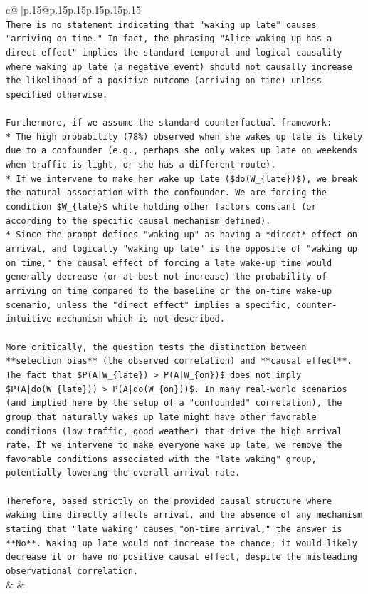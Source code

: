 \documentclass{article}
\begin{document}
{\begin{supertabular}{c@{$\;$}|p{.15\linewidth}@{}p{.15\linewidth}p{.15\linewidth}p{.15\linewidth}p{.15\linewidth}p{.15\linewidth}}
{{{\\ 
\texttt{There is no statement indicating that "waking up late" causes "arriving on time." In fact, the phrasing "Alice waking up has a direct effect" implies the standard temporal and logical causality where waking up late (a negative event) should not causally increase the likelihood of a positive outcome (arriving on time) unless specified otherwise.} \\
\\ 
\texttt{Furthermore, if we assume the standard counterfactual framework:} \\
\texttt{*   The high probability (78\%) observed when she wakes up late is likely due to a confounder (e.g., perhaps she only wakes up late on weekends when traffic is light, or she has a different route).} \\
\texttt{*   If we intervene to make her wake up late (\$do(W\_\{late\})\$), we break the natural association with the confounder. We are forcing the condition \$W\_\{late\}\$ while holding other factors constant (or according to the specific causal mechanism defined).} \\
\texttt{*   Since the prompt defines "waking up" as having a *direct* effect on arrival, and logically "waking up late" is the opposite of "waking up on time," the causal effect of forcing a late wake{-}up time would generally decrease (or at best not increase) the probability of arriving on time compared to the baseline or the on{-}time wake{-}up scenario, unless the "direct effect" implies a specific, counter{-}intuitive mechanism which is not described.} \\
\\ 
\texttt{More critically, the question tests the distinction between **selection bias** (the observed correlation) and **causal effect**. The fact that \$P(A|W\_\{late\}) > P(A|W\_\{on\})\$ does not imply \$P(A|do(W\_\{late\})) > P(A|do(W\_\{on\}))\$. In many real{-}world scenarios (and implied here by the setup of a "confounded" correlation), the group that naturally wakes up late might have other favorable conditions (low traffic, good weather) that drive the high arrival rate. If we intervene to make everyone wake up late, we remove the favorable conditions associated with the "late waking" group, potentially lowering the overall arrival rate.} \\
\\ 
\texttt{Therefore, based strictly on the provided causal structure where waking time directly affects arrival, and the absence of any mechanism stating that "late waking" causes "on{-}time arrival," the answer is **No**. Waking up late would not increase the chance; it would likely decrease it or have no positive causal effect, despite the misleading observational correlation.} \\
            }
        }
    }
    & & \\ \\


\end{supertabular}}
\end{document}
